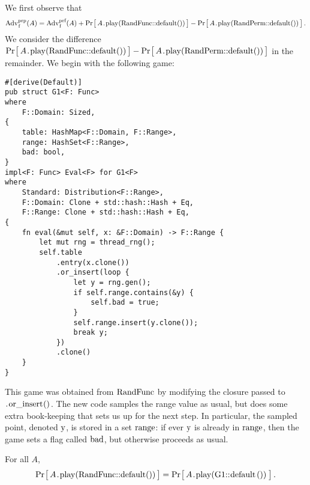 We first observe that
%
\[
  \Adv{prp}_\code{f}(A) =
      \Adv{prf}_\code{f}(A) +
      \Prob{A\code{.play(RandFunc::default())}} -
      \Prob{A\code{.play(RandPerm::default())}} \,.
\]
%
We consider the difference $\Prob{A\code{.play(RandFunc::default())}} -
\Prob{A\code{.play(RandPerm::default())}}$ in the remainder.
%
We begin with the following game:
%
\begin{lstlisting}
#[derive(Default)]
pub struct G1<F: Func>
where
    F::Domain: Sized,
{
    table: HashMap<F::Domain, F::Range>,
    range: HashSet<F::Range>,
    bad: bool,
}
impl<F: Func> Eval<F> for G1<F>
where
    Standard: Distribution<F::Range>,
    F::Domain: Clone + std::hash::Hash + Eq,
    F::Range: Clone + std::hash::Hash + Eq,
{
    fn eval(&mut self, x: &F::Domain) -> F::Range {
        let mut rng = thread_rng();
        self.table
            .entry(x.clone())
            .or_insert(loop {
                let y = rng.gen();
                if self.range.contains(&y) {
                    self.bad = true;
                }
                self.range.insert(y.clone());
                break y;
            })
            .clone()
    }
}
\end{lstlisting}
%
This game was obtained from \hyperref[sec/func/ideal]{$\code{RandFunc}$} by
modifying the closure passed to $\code{.or_insert()}$. The new code samples the
range value as usual, but does some extra book-keeping that sets us up for the
next step. In particular, the sampled point, denoted $\code{y}$, is stored in a
set $\code{range}$: if ever $\code{y}$ is already in $\code{range}$, then the
game sets a flag called $\code{bad}$, but otherwise proceeds as usual.

\begin{claim}
  For all $A$,
  \[
     \Prob{A\code{.play(RandFunc::default())}} =
     \Prob{A\code{.play(G1::default())}} \,.
  \]
\end{claim}
%

